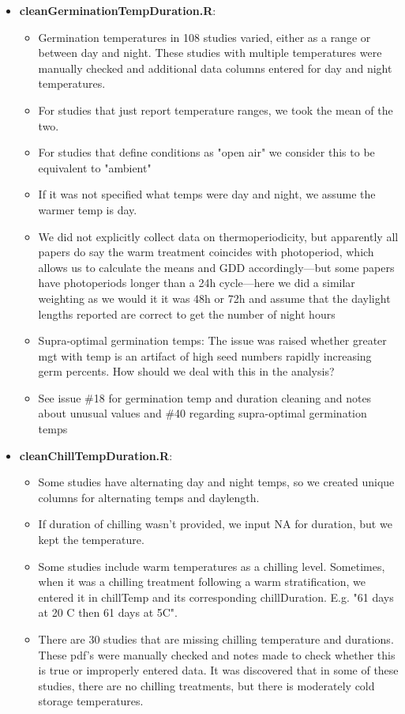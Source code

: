 \documentclass{article}[12pt]
\begin{document}
\begin{enumerate}
\begin{itemize}
\item \textbf{cleanGerminationTempDuration.R}: 
\begin{itemize} 
\item Germination temperatures in 108 studies varied, either as a range or between day and night. These studies with multiple temperatures were manually checked and additional data columns entered for day and night temperatures. 
\item For studies that just report temperature ranges, we took the mean of the two. 
\item For studies that define conditions as "open air" we consider this to be equivalent to "ambient"
\item If it was not specified what temps were day and night, we assume the warmer temp is day. 
\item We did not explicitly collect data on thermoperiodicity, but apparently all papers do say the warm treatment coincides with photoperiod, which allows us to calculate the means and GDD accordingly---but some papers have photoperiods longer than a 24h cycle---here we did a similar weighting as we would it it was 48h or 72h and assume that the daylight lengths reported are correct to get the number of night hours 
\item Supra-optimal germination temps: The issue was raised whether greater mgt with temp is an artifact of high seed numbers rapidly increasing germ percents. How should we deal with this in the analysis?
\item See issue \#18 for germination temp and duration cleaning and notes about unusual values and \#40 regarding supra-optimal germination temps
\end{itemize}
\item \textbf{cleanChillTempDuration.R}: 
\begin{itemize}
\item Some studies have alternating day and night temps, so we created unique columns for alternating temps and daylength. %
\item If duration of chilling wasn't provided, we input NA for duration, but we kept the temperature.
\item Some studies include warm temperatures as a chilling level. Sometimes, when it was a chilling treatment following a warm stratification, we entered it in chillTemp and its corresponding chillDuration. E.g.  "61 days at 20 C then 61 days at 5C". 
\item There are 30 studies that are missing chilling temperature and durations. These pdf's were manually checked and notes made to check whether this is true or improperly entered data. It was discovered that in some of these studies, there are no chilling treatments, but there is moderately cold storage temperatures. 

\end{itemize}
\end{itemize}
\end{enumerate}
\end{document}
